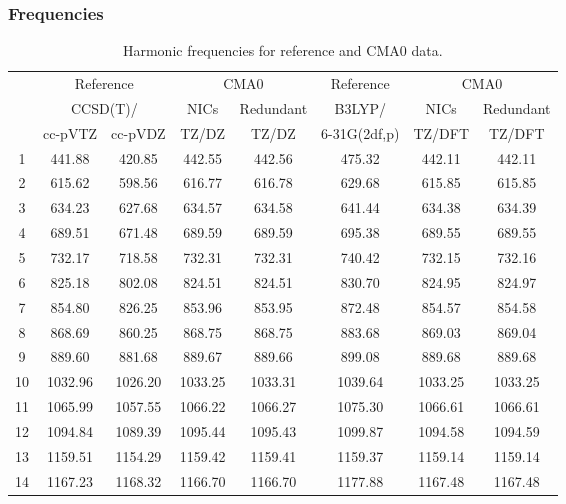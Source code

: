 \documentclass[10pt,oneside]{article}
\begin{document}
\begin{table}[h!]
\subsubsection*{Frequencies}
\centering
\caption{Harmonic frequencies for reference and CMA0 data.}
\begin{tabular}{cccccccc}
\toprule
{} & \multicolumn{2}{c}{Reference} & \multicolumn{2}{c}{CMA0} &    Reference & \multicolumn{2}{c}{CMA0} \\
{} & \multicolumn{2}{c}{CCSD(T)/} &    NICs &  Redundant &       B3LYP/ &    NICs & Redundant \\
{} &   cc-pVTZ & cc-pVDZ &   TZ/DZ &      TZ/DZ & 6-31G(2df,p) &  TZ/DFT &    TZ/DFT \\
\midrule
1  &    441.88 &  420.85 &  442.55 &     442.56 &       475.32 &  442.11 &    442.11 \\
2  &    615.62 &  598.56 &  616.77 &     616.78 &       629.68 &  615.85 &    615.85 \\
3  &    634.23 &  627.68 &  634.57 &     634.58 &       641.44 &  634.38 &    634.39 \\
4  &    689.51 &  671.48 &  689.59 &     689.59 &       695.38 &  689.55 &    689.55 \\
5  &    732.17 &  718.58 &  732.31 &     732.31 &       740.42 &  732.15 &    732.16 \\
6  &    825.18 &  802.08 &  824.51 &     824.51 &       830.70 &  824.95 &    824.97 \\
7  &    854.80 &  826.25 &  853.96 &     853.95 &       872.48 &  854.57 &    854.58 \\
8  &    868.69 &  860.25 &  868.75 &     868.75 &       883.68 &  869.03 &    869.04 \\
9  &    889.60 &  881.68 &  889.67 &     889.66 &       899.08 &  889.68 &    889.68 \\
10 &   1032.96 & 1026.20 & 1033.25 &    1033.31 &      1039.64 & 1033.25 &   1033.25 \\
11 &   1065.99 & 1057.55 & 1066.22 &    1066.27 &      1075.30 & 1066.61 &   1066.61 \\
12 &   1094.84 & 1089.39 & 1095.44 &    1095.43 &      1099.87 & 1094.58 &   1094.59 \\
13 &   1159.51 & 1154.29 & 1159.42 &    1159.41 &      1159.37 & 1159.14 &   1159.14 \\
14 &   1167.23 & 1168.32 & 1166.70 &    1166.70 &      1177.88 & 1167.48 &   1167.48 \\

\end{tabular}
\end{table}
\end{document}
